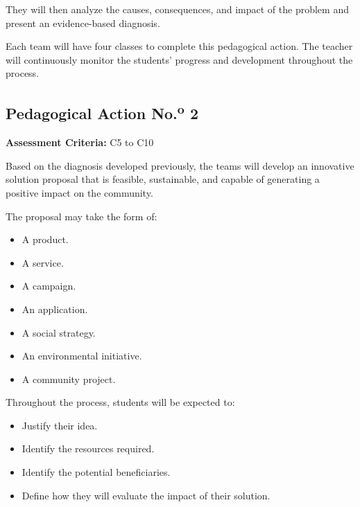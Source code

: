 \documentclass[12pt,a4paper]{article}
\begin{document}
	They will then analyze the causes, consequences, and impact of the
	problem and present an evidence-based diagnosis.
	
	Each team will have four classes to complete this pedagogical action.
	The teacher will continuously monitor the students' progress and
	development throughout the process.
	
	
	\subsection{Pedagogical Action No.\textsuperscript{o} 2}
	
	\textbf{Assessment Criteria:} C5 to C10
	
	Based on the diagnosis developed previously, the teams will develop
	an innovative solution proposal that is feasible, sustainable, and
	capable of generating a positive impact on the community.
	
	The proposal may take the form of:
	
	\begin{itemize}
		
		\item A product.
		
		\item A service.
		
		\item A campaign.
		
		\item An application.
		
		\item A social strategy.
		
		\item An environmental initiative.
		
		\item A community project.
		
	\end{itemize}
	
	Throughout the process, students will be expected to:
	
	\begin{itemize}
		
		\item Justify their idea.
		
		\item Identify the resources required.
		
		\item Identify the potential beneficiaries.
		
		\item Define how they will evaluate the impact of their solution.
		
	\end{itemize}
	
\end{document}
